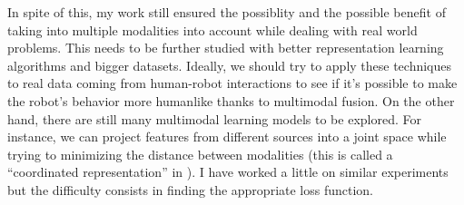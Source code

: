 In spite of this, my work still ensured the possiblity and the possible
benefit of taking into multiple modalities into account while
dealing with real world problems. This needs to be further studied
with better representation learning algorithms and bigger datasets.
Ideally, we should try to apply these techniques to real
data coming from human-robot interactions to see if it's possible
to make the robot's behavior more humanlike thanks to multimodal fusion.
On the other hand, there are still many multimodal learning models
to be explored. For instance, we can project features from different
sources into a joint space while trying to minimizing the distance
between modalities (this is called a ``coordinated representation''
in \cite{T. Baltrusaitis 2017}). I have worked a little on similar
experiments but the difficulty consists in finding the appropriate
loss function.



